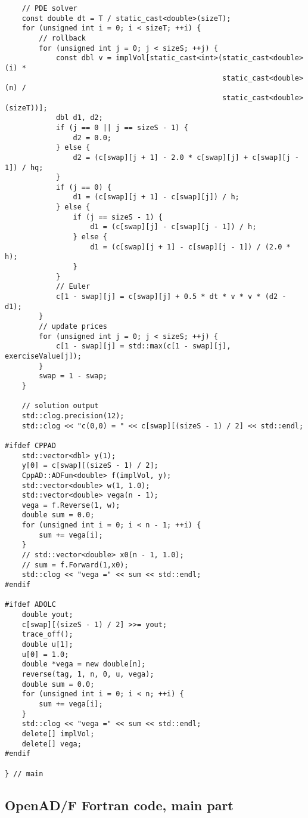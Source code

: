 \documentclass{amsart}
\theoremstyle{plain}
\numberwithin{equation}{section}
\begin{document}
\begin{verbatim}
    // PDE solver
    const double dt = T / static_cast<double>(sizeT);
    for (unsigned int i = 0; i < sizeT; ++i) {
        // rollback
        for (unsigned int j = 0; j < sizeS; ++j) {
            const dbl v = implVol[static_cast<int>(static_cast<double>(i) *
                                                   static_cast<double>(n) /
                                                   static_cast<double>(sizeT))];
            dbl d1, d2;
            if (j == 0 || j == sizeS - 1) {
                d2 = 0.0;
            } else {
                d2 = (c[swap][j + 1] - 2.0 * c[swap][j] + c[swap][j - 1]) / hq;
            }
            if (j == 0) {
                d1 = (c[swap][j + 1] - c[swap][j]) / h;
            } else {
                if (j == sizeS - 1) {
                    d1 = (c[swap][j] - c[swap][j - 1]) / h;
                } else {
                    d1 = (c[swap][j + 1] - c[swap][j - 1]) / (2.0 * h);
                }
            }
            // Euler
            c[1 - swap][j] = c[swap][j] + 0.5 * dt * v * v * (d2 - d1);
        }
        // update prices
        for (unsigned int j = 0; j < sizeS; ++j) {
            c[1 - swap][j] = std::max(c[1 - swap][j], exerciseValue[j]);
        }
        swap = 1 - swap;
    }

    // solution output
    std::clog.precision(12);
    std::clog << "c(0,0) = " << c[swap][(sizeS - 1) / 2] << std::endl;

#ifdef CPPAD
    std::vector<dbl> y(1);
    y[0] = c[swap][(sizeS - 1) / 2];
    CppAD::ADFun<double> f(implVol, y);
    std::vector<double> w(1, 1.0);
    std::vector<double> vega(n - 1);
    vega = f.Reverse(1, w);
    double sum = 0.0;
    for (unsigned int i = 0; i < n - 1; ++i) {
        sum += vega[i];
    }
    // std::vector<double> x0(n - 1, 1.0);
    // sum = f.Forward(1,x0);
    std::clog << "vega =" << sum << std::endl;
#endif

#ifdef ADOLC
    double yout;
    c[swap][(sizeS - 1) / 2] >>= yout;
    trace_off();
    double u[1];
    u[0] = 1.0;
    double *vega = new double[n];
    reverse(tag, 1, n, 0, u, vega);
    double sum = 0.0;
    for (unsigned int i = 0; i < n; ++i) {
        sum += vega[i];
    }
    std::clog << "vega =" << sum << std::endl;
    delete[] implVol;
    delete[] vega;
#endif

} // main
\end{verbatim}

\subsection{OpenAD/F Fortran code, main part}
\end{document}
